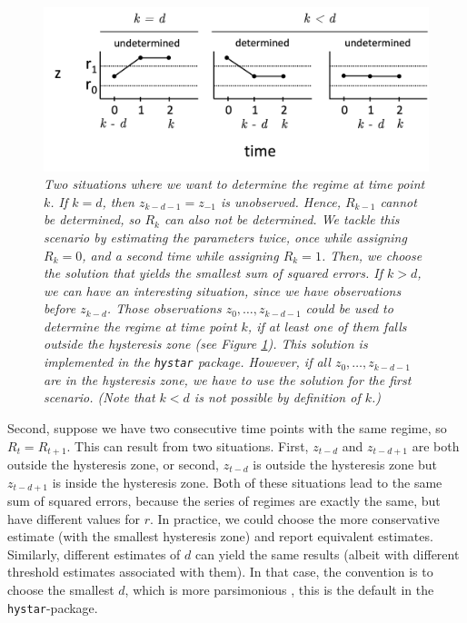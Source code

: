 \documentclass{article}
\begin{document}
\begin{figure}
\begin{center}
\includegraphics[scale=.6]{unknown_start.png}
\caption{\textit{Two situations where we want to determine the regime at time point $k$. 
If $k = d$, then $z_{k-d-1} = z_{-1}$ is unobserved. Hence, $R_{k-1}$ cannot be determined, so $R_{k}$ can also not be determined. We tackle this scenario by estimating the parameters twice, once while assigning $R_k = 0$, and a second time while assigning $R_k = 1$. Then, we choose the solution that yields the smallest sum of squared errors.
If $k > d$, we can have an interesting situation, since we have observations before $z_{k-d}$. 
Those observations $z_{0}, \dots, z_{k - d - 1}$ could be used to determine the regime at time point $k$, if at least one of them falls outside the hysteresis zone (see Figure \ref{fig:unknown_start}). This solution is implemented in the \texttt{hystar} package. 
However, if all $z_{0}, \dots, z_{k - d - 1}$ are in the hysteresis zone, we have to use the solution for the first scenario. (Note that $k < d$ is not possible by definition of $k$.)}}
\label{fig:unknown_start}
\end{center}
\end{figure}

Second, suppose we have two consecutive time points with the same regime, so $R_t = R_{t+1}$. This can result from two situations. First, $z_{t - d}$ and $z_{t - d + 1}$ are both outside the hysteresis zone, or second, $z_{t - d}$ is outside the hysteresis zone but $z_{t - d + 1}$ is inside the hysteresis zone. Both of these situations lead to the same sum of squared errors, because the series of regimes are exactly the same, but have different values for $r$.
In practice, we could choose the more conservative estimate (with the smallest hysteresis zone) and report equivalent estimates. Similarly, different estimates of $d$ can yield the same results (albeit with different threshold estimates associated with them). 
In that case, the convention is to choose the smallest $d$, which is more parsimonious \citep{bar2}, this is the default in the \texttt{hystar}-package.
\end{document}

